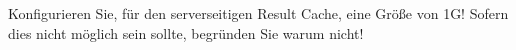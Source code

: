     \item Konfigurieren Sie, f\"ur den serverseitigen Result Cache, eine
    Gr\"o\ss{}e von 1G! Sofern dies nicht möglich sein sollte, begründen Sie
    warum nicht!
